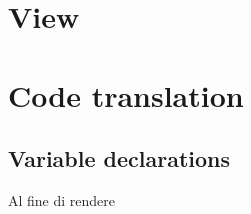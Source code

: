 \documentclass{article}
\begin{document}
\section{View}


\section{Code translation}
\subsection{Variable declarations}
Al fine di rendere 
\end{document}
